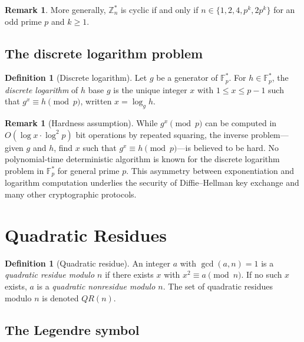 \documentclass[twoside,12pt]{book}
\theoremstyle{plain}
\theoremstyle{definition}
\newtheorem{definition}[theorem]{Definition}
\newtheorem{remark}[theorem]{Remark}
\theoremstyle{remark}
\begin{document}
\begin{remark}
More generally, $\mathbb{Z}_n^*$ is cyclic if and only if $n \in \{1, 2, 4, p^k, 2p^k\}$ for an odd prime $p$ and $k \geq 1$.
\end{remark}

\subsection{The discrete logarithm problem}

\begin{definition}[Discrete logarithm]
Let $g$ be a generator of $\mathbb{F}_p^*$. For $h \in \mathbb{F}_p^*$, the \emph{discrete logarithm} of $h$ base $g$ is the unique integer $x$ with $1 \leq x \leq p-1$ such that $g^x \equiv h \pmod{p}$, written $x = \log_g h$.
\end{definition}

\begin{remark}[Hardness assumption]
While $g^x \pmod{p}$ can be computed in $O(\log x \cdot \log^2 p)$ bit operations by repeated squaring, the inverse problem---given $g$ and $h$, find $x$ such that $g^x \equiv h \pmod{p}$---is believed to be hard. No polynomial-time deterministic algorithm is known for the discrete logarithm problem in $\mathbb{F}_p^*$ for general prime $p$. This asymmetry between exponentiation and logarithm computation underlies the security of Diffie--Hellman key exchange and many other cryptographic protocols.
\end{remark}

\section{Quadratic Residues}
\label{sec:quadratic-residues}

\begin{definition}[Quadratic residue]
An integer $a$ with $\gcd(a, n) = 1$ is a \emph{quadratic residue modulo $n$} if there exists $x$ with $x^2 \equiv a \pmod{n}$. If no such $x$ exists, $a$ is a \emph{quadratic nonresidue modulo $n$}. The set of quadratic residues modulo $n$ is denoted $QR(n)$.
\end{definition}

\subsection{The Legendre symbol}
\end{document}
